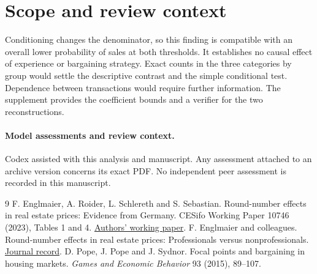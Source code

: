 \documentclass[11pt]{article}
\begin{document}
\section{Scope and review context}
Conditioning changes the denominator, so this finding is compatible with an overall lower probability of sales at both thresholds. It establishes no causal effect of experience or bargaining strategy. Exact counts in the three categories by group would settle the descriptive contrast and the simple conditional test. Dependence between transactions would require further information. The supplement provides the coefficient bounds and a verifier for the two reconstructions.

\paragraph{Model assessments and review context.} Codex assisted with this analysis and manuscript. Any assessment attached to an archive version concerns its exact PDF. No independent peer assessment is recorded in this manuscript.

\begin{thebibliography}{9}
 F. Englmaier, A. Roider, L. Schlereth and S. Sebastian. Round-number effects in real estate prices: Evidence from Germany. CESifo Working Paper 10746 (2023), Tables 1 and 4. \href{https://www.ifo.de/DocDL/cesifo1_wp10746.pdf}{Authors' working paper}.
 F. Englmaier and colleagues. Round-number effects in real estate prices: Professionals versus nonprofessionals. \href{https://doi.org/10.1080/08965803.2026.2760609}{Journal record}.
 D. Pope, J. Pope and J. Sydnor. Focal points and bargaining in housing markets. \emph{Games and Economic Behavior} 93 (2015), 89--107.
\end{thebibliography}
\end{document}
